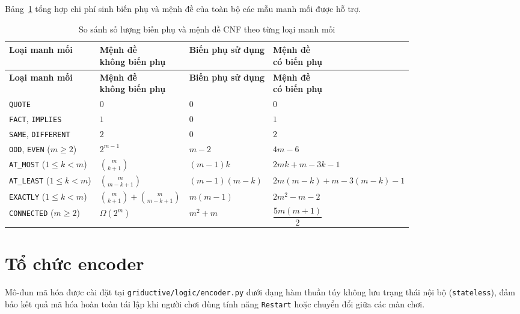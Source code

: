 Bảng~\ref{tab:cnf_complexity} tổng hợp chi phí sinh biến phụ và mệnh đề của toàn bộ các mẫu manh mối được hỗ trợ.

\begingroup
\small\linespread{1.15}\selectfont
\begin{longtable}{@{}p{}p{}p{}p{}@{}}
\caption{So sánh số lượng biến phụ và mệnh đề CNF theo từng loại manh mối}\label{tab:cnf_complexity}\\
\toprule
\textbf{Loại manh mối} & \makecell{\textbf{Mệnh đề}\\\textbf{không biến phụ}} & \textbf{Biến phụ sử dụng} & \makecell{\textbf{Mệnh đề}\\\textbf{có biến phụ}} \\
\midrule
\endfirsthead
\toprule
\textbf{Loại manh mối} & \makecell{\textbf{Mệnh đề}\\\textbf{không biến phụ}} & \textbf{Biến phụ sử dụng} & \makecell{\textbf{Mệnh đề}\\\textbf{có biến phụ}} \\
\midrule
\endhead
\texttt{QUOTE} & $0$ & $0$ & $0$ \\
\addlinespace
\texttt{FACT}, \texttt{IMPLIES} & $1$ & $0$ & $1$ \\
\addlinespace
\texttt{SAME}, \texttt{DIFFERENT} & $2$ & $0$ & $2$ \\
\addlinespace
\texttt{ODD}, \texttt{EVEN} ($m \ge 2$) & $2^{m-1}$ & $m - 2$ & $4m - 6$ \\
\addlinespace
\texttt{AT\_MOST} ($1 \le k < m$) & $\binom{m}{k+1}$ & $(m - 1)k$ & $2mk + m - 3k - 1$ \\
\addlinespace
\texttt{AT\_LEAST} ($1 \le k < m$) & $\binom{m}{m-k+1}$ & $(m - 1)(m - k)$ & $2m(m - k) + m - 3(m - k) - 1$ \\
\addlinespace
\texttt{EXACTLY} ($1 \le k < m$) & $\binom{m}{k+1} + \binom{m}{m-k+1}$ & $m(m - 1)$ & $2m^2 - m - 2$ \\
\addlinespace
\texttt{CONNECTED} ($m \ge 2$) & $\Omega(2^m)$ & $m^2 + m$ & $\dfrac{5m(m + 1)}{2}$ \\
\bottomrule
\end{longtable}
\endgroup

\section{Tổ chức encoder}
Mô-đun mã hóa được cài đặt tại \texttt{griductive/logic/encoder.py} dưới dạng hàm thuần túy không lưu trạng thái nội bộ (\texttt{stateless}), đảm bảo kết quả mã hóa hoàn toàn tái lập khi người chơi dùng tính năng \texttt{Restart} hoặc chuyển đổi giữa các màn chơi.

